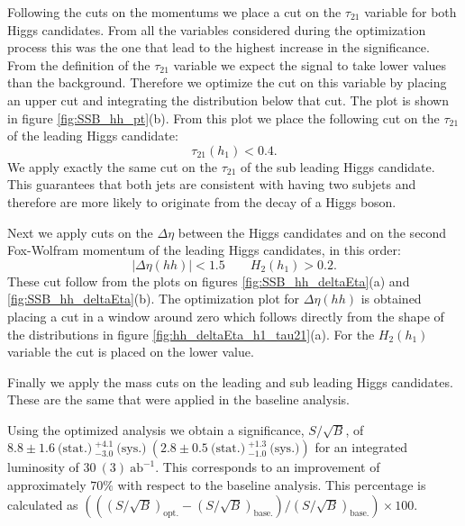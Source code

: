 Following the cuts on the momentums we place a cut on the $\tau_{21}$ variable for both Higgs candidates. From all the variables considered during the optimization process this was the one that lead to the highest increase in the significance. From the definition of the $\tau_{21}$ variable we expect the signal to take lower values than the background. Therefore we optimize the cut on this variable by placing an upper cut and integrating the distribution below that cut. The plot is shown in figure \ref{fig:SSB_hh_pt}(b). From this plot we place the following cut on the $\tau_{21}$ of the leading Higgs candidate:
\begin{equation}
	\tau_{21}(h_1)<0.4.
\end{equation}
We apply exactly the same cut on the $\tau_{21}$ of the sub leading Higgs candidate. This guarantees that both jets are consistent with having two subjets and therefore are more likely to originate from the decay of a Higgs boson.

Next we apply cuts on the $\Delta\eta$ between the Higgs candidates and on the second Fox-Wolfram momentum of the leading Higgs candidates, in this order:
\begin{equation}
	|\Delta\eta(hh)|<1.5 \qquad H_2(h_1)>0.2.
\end{equation} 
These cut follow from the plots on figures \ref{fig:SSB_hh_deltaEta}(a) and \ref{fig:SSB_hh_deltaEta}(b). The optimization plot for $\Delta\eta(hh)$ is obtained placing a cut in a window around zero which follows directly from the shape of the distributions in figure \ref{fig:hh_deltaEta_h1_tau21}(a). For the $H_2(h_1)$ variable the cut is placed on the lower value.

Finally we apply the mass cuts on the leading and sub leading Higgs candidates. These are the same that were applied in the baseline analysis.

Using the optimized analysis we obtain a significance, $S/\sqrt{B}$, of $8.8\pm 1.6~\text{(stat.)}~^{+4.1}_{-3.0}~\text{(sys.)}~(2.8\pm 0.5~\text{(stat.)}~^{+1.3}_{-1.0}~\text{(sys.)})$ for an integrated luminosity of $30~(3)~\text{ab}^{-1}$. This corresponds to an improvement of approximately $70\%$ with respect to the baseline analysis. This percentage is calculated as $\left(((S/\sqrt{B})_{\text{opt.}}-(S/\sqrt{B})_{\text{base.}})/(S/\sqrt{B})_{\text{base.}}\right)\times 100$.

